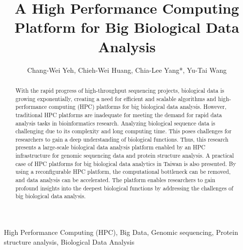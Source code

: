 \documentclass[conference]{IEEEtran}
\begin{document}
\title{\fontsize{16}{24}\bfseries\selectfont A High Performance Computing Platform for Big Biological Data Analysis}

\author{Chang-Wei Yeh, Chieh-Wei Huang, Chia-Lee Yang*, Yu-Tai Wang}

\renewcommand\Affilfont{\fontsize{10}{13}\selectfont}

\maketitle
\thispagestyle{fancy}

\begin{abstract}
With the rapid progress of high-throughput sequencing projects, biological data is growing exponentially, creating a need for efficient and scalable algorithms and high-performance computing (HPC) platforms for big biological data analysis. However, traditional HPC platforms are inadequate for meeting the demand for rapid data analysis tasks in bioinformatics research. Analyzing biological sequence data is challenging due to its complexity and long computing time. This poses challenges for researchers to gain a deep understanding of biological functions. Thus, this research presents a large-scale biological data analysis platform enabled by an HPC infrastructure for genomic sequencing data and protein structure analysis. A practical case of HPC platforms for big biological data analytics in Taiwan is also presented. By using a reconfigurable HPC platform, the computational bottleneck can be removed, and data analysis can be accelerated. The platform enables researchers to gain profound insights into the deepest biological functions by addressing the challenges of big biological data analysis.
\end{abstract}

\begin{IEEEkeywords}
High Performance Computing (HPC), Big Data, Genomic sequencing, Protein structure analysis, Biological Data Analysis
\end{IEEEkeywords}
\end{document}
